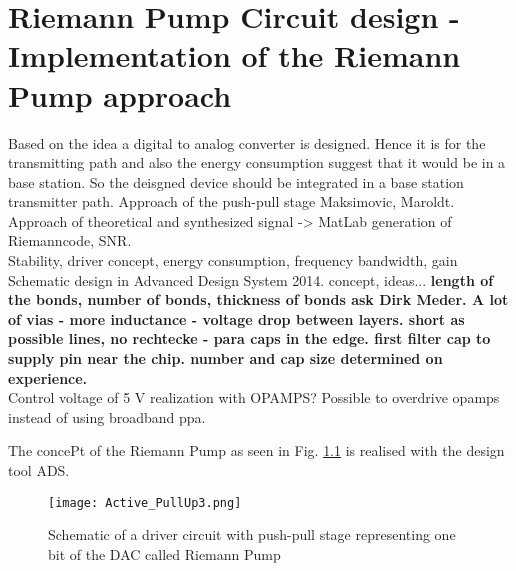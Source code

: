 \chapter{Riemann Pump Circuit design - Implementation of the Riemann Pump approach}
Based on the idea a digital to analog converter is designed. Hence it is for the transmitting path and also the energy consumption suggest that it would be in a base station. So the deisgned device should be integrated in a base station transmitter path.
Approach of the push-pull stage Maksimovic, Maroldt.\\
Approach of theoretical and synthesized signal -> MatLab generation of Riemanncode, SNR.\\ Stability, driver concept, energy consumption, frequency bandwidth, gain
Schematic design in Advanced Design System 2014. concept, ideas... 
\textbf{length of the bonds, number of bonds, thickness of bonds ask Dirk Meder. A lot of vias - more inductance - voltage drop between layers. short as possible lines, no rechtecke - para caps in the edge. first filter cap to supply pin near the chip. number and cap size determined on experience. }\\
Control voltage of 5 V realization with OPAMPS? Possible to overdrive opamps instead of using broadband ppa. 

The concePt of the Riemann Pump as seen in Fig. \ref{RiemannPumpConcept} is realised with the design tool ADS.

\begin{figure}[ht]
	\centering
  \texttt{[image: Active\_PullUp3.png]}
	\caption{Schematic of a driver circuit with push-pull stage representing one bit of the DAC called Riemann Pump}
	\label{RiemannPumpConcept}
\end{figure}